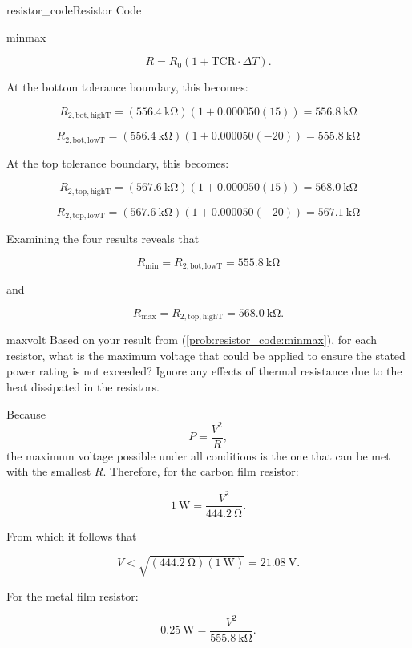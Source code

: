 \begin{mainquestion}{resistor_code}{Resistor Code}
\begin{partquestion}{minmax}
\begin{answer}
\[
R=R_0\left(1+\mathrm{TCR}\cdot\Delta T\right).
\]

At the bottom tolerance boundary, this becomes:

\[
R_{2,\mathrm{bot,highT}}
=
\left(\qty{556.4}{\kilo\ohm}\right)
\left(1+0.000050\left(15\right)\right)
=
\qty{556.8}{\kilo\ohm}
\]

\[
R_{2,\mathrm{bot,lowT}}
=
\left(\qty{556.4}{\kilo\ohm}\right)
\left(1+0.000050\left(-20\right)\right)
=
\qty{555.8}{\kilo\ohm}
\]

At the top tolerance boundary, this becomes:

\[
R_{2,\mathrm{top,highT}}
=
\left(\qty{567.6}{\kilo\ohm}\right)
\left(1+0.000050\left(15\right)\right)
=
\qty{568.0}{\kilo\ohm}
\]

\[
R_{2,\mathrm{top,lowT}}
=
\left(\qty{567.6}{\kilo\ohm}\right)
\left(1+0.000050\left(-20\right)\right)
=
\qty{567.1}{\kilo\ohm}
\]

Examining the four results reveals that

\[
R_{\mathrm{min}}
=
R_{2,\mathrm{bot,lowT}}
=
\qty{555.8}{\kilo\ohm}
\]

and

\[
R_{\mathrm{max}}
=
R_{2,\mathrm{top,highT}}
=
\qty{568.0}{\kilo\ohm}.
\]
\end{answer}
\end{partquestion}

\begin{partquestion}{maxvolt}
{Based on your result from (\cref{prob:resistor_code:minmax}), for each resistor, what is the maximum voltage that could be applied to ensure the stated power rating is not exceeded? Ignore any effects of thermal resistance due to the heat dissipated in the resistors.}

\begin{answer}

Because
\[
P=\frac{V^2}{R},
\]
the maximum voltage possible under all conditions is the one that can be met with the smallest $R$. Therefore, for the carbon film resistor:

\[
\qty{1}{\watt}
=
\frac{V^2}{\qty{444.2}{\ohm}}.
\]

From which it follows that

\[
V
<
\sqrt{\left(\qty{444.2}{\ohm}\right)\left(\qty{1}{\watt}\right)}
=
\qty{21.08}{\volt}.
\]

For the metal film resistor:

\[
\qty{0.25}{\watt}
=
\frac{V^2}{\qty{555.8}{\kilo\ohm}}.
\]


\end{answer}
\end{partquestion}
\end{mainquestion}
